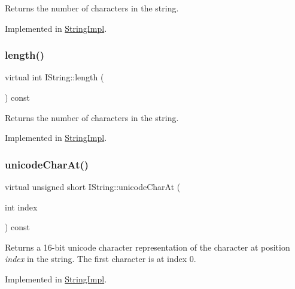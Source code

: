 Returns the number of characters in the string. 

Implemented in \mbox{\hyperlink{class_string_impl_a52096f97ab17336a71a81e3c81e759ca}{String\+Impl}}.

\mbox{\label{class_i_string_acbd29581b11e69494ce0141e2425071a}} 
\subsubsection{\texorpdfstring{length()}{length()}\hspace{0.1cm}{\footnotesize\ttfamily [2/2]}}
{\footnotesize\ttfamily virtual int I\+String\+::length (\begin{DoxyParamCaption}{ }\end{DoxyParamCaption}) const\hspace{0.3cm}{\ttfamily [pure virtual]}}

Returns the number of characters in the string. 

Implemented in \mbox{\hyperlink{class_string_impl_a52096f97ab17336a71a81e3c81e759ca}{String\+Impl}}.

\mbox{\label{class_i_string_a7a3b84f1621cb087e22b4c8b4246b7d1}} 
\subsubsection{\texorpdfstring{unicodeCharAt()}{unicodeCharAt()}\hspace{0.1cm}{\footnotesize\ttfamily [1/2]}}
{\footnotesize\ttfamily virtual unsigned short I\+String\+::unicode\+Char\+At (\begin{DoxyParamCaption}\item[{int}]{index }\end{DoxyParamCaption}) const\hspace{0.3cm}{\ttfamily [pure virtual]}}

Returns a 16-\/bit unicode character representation of the character at position {\itshape index} in the string. The first character is at index 0. 

Implemented in \mbox{\hyperlink{class_string_impl_a002b2e0e2a91769a583437b6510ed409}{String\+Impl}}.

\mbox{\label{class_i_string_a7a3b84f1621cb087e22b4c8b4246b7d1}} 
